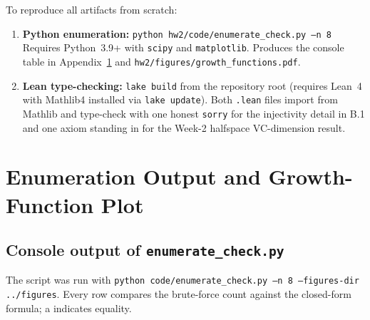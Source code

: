 \documentclass{article}
\begin{document}
To reproduce all artifacts from scratch:
\begin{enumerate}
  \item \textbf{Python enumeration:}
    \texttt{python hw2/code/enumerate\_check.py --n 8}\\
    Requires Python~3.9+ with \texttt{scipy} and \texttt{matplotlib}.
    Produces the console table in Appendix~\ref{app:enum} and
    \texttt{hw2/figures/growth\_functions.pdf}.
  \item \textbf{Lean type-checking:}
    \texttt{lake build} from the repository root (requires Lean~4 with
    Mathlib4 installed via \texttt{lake update}).
    Both \texttt{.lean} files import from Mathlib and type-check with
    one honest \texttt{sorry} for the injectivity detail in B.1 and
    one axiom standing in for the Week-2 halfspace VC-dimension result.
\end{enumerate}
 
\section{Enumeration Output and Growth-Function Plot}
\label{app:enum}
 
\subsection{Console output of \texttt{enumerate\_check.py}}
 
The script was run with
\texttt{python code/enumerate\_check.py --n 8 --figures-dir ../figures}.
Every row compares the brute-force count against the closed-form formula;
a \checkmark{} indicates equality.
 
\end{document}

